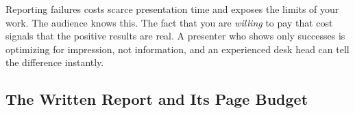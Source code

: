 \begin{intuition}
Reporting failures costs scarce presentation time and exposes the limits of your work. The audience knows this. The fact that you are \emph{willing} to pay that cost signals that the positive results are real. A presenter who shows only successes is optimizing for impression, not information, and an experienced desk head can tell the difference instantly.
\end{intuition}

\subsection{The Written Report and Its Page Budget}
\label{subsec:report-structure}

